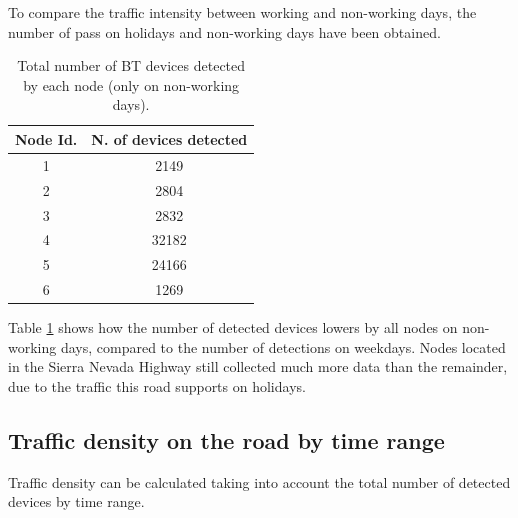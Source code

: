 \documentclass[preprint,authoryear,12pt]{elsarticle}
\begin{document}
To compare the traffic intensity between working and non-working days, the number of pass on holidays and non-working days have been obtained.

 \begin{table}
 \begin{center}
 \begin{tabular}{|c|c|}
 \hline
Node Id.  &  N. of devices detected  \\
 \hline
    1     &    2149  \\
 \hline
    2     &    2804  \\
 \hline
    3     &    2832  \\
 \hline
    4     &    32182  \\
 \hline
    5     &    24166  \\
 \hline
    6     &    1269  \\
 \hline
 \end{tabular}
 \end{center}
 \caption{Total number of BT devices detected by each node (only on non-working days).
 \label{VehiculosFestivos}}
 \end{table}


Table \ref{VehiculosFestivos} shows how the number of detected devices lowers by all nodes on non-working days, compared to the number of detections on weekdays.
Nodes located in the Sierra Nevada Highway still collected much more data than the remainder, due to the traffic this road supports on holidays.


\subsection{Traffic density on the road by time range}

Traffic density can be calculated taking into account the total number of detected devices by time range.
\end{document}
